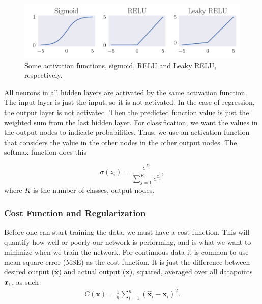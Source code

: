 \documentclass[12pt]{extarticle}
\begin{document}
\begin{figure}[h]
	\includegraphics[width=\linewidth]{pictures/activation_functions.pdf}
	\caption{Some activation functions, sigmoid, RELU and Leaky RELU, respectively.}\label{fig:activation_functions}
\end{figure}

All neurons in all hidden layers are activated by the same activation function. The input layer is just the input, so it is not activated. In the case of regression, the output layer is not activated. Then the predicted function value is just the weighted sum from the last hidden layer. For classification, we want the values in the output nodes to indicate probabilities. Thus, we use an activation function that considers the value in the other nodes in the other output nodes. The softmax function does this

\begin{equation}
	\sigma(z_i) = \frac{e^{z_i}}{\sum_{j=1}^Ke^{z_j}},
\end{equation}
where $K$ is the number of classes, output nodes.

\subsubsection{Cost Function and Regularization}\label{sec:cost_func_and_regul}
Before one can start training the data, we must have a cost function. This will quantify how well or poorly our network is performing, and is what we want to minimize when we train the network. For continuous data it is common to use mean square error (MSE) as the cost function. It is just the difference between desired output ($\hat{\mathbf{x}}$) and actual output ($\mathbf{x}$), squared, averaged over all datapoints $\boldsymbol x_i$, as such
\begin{align}
	C(\mathbf{x}) = \frac{1}{n}\sum_{i=1}^{n}(\hat{\mathbf{x}}_i - \mathbf{x}_i)^2.
	\label{eq:MSE}
\end{align}
\end{document}
